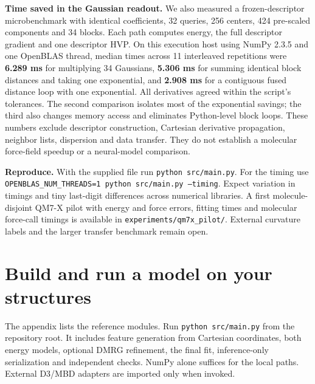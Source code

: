 \documentclass[11pt,a4paper]{article}
\begin{document}
\textbf{Time saved in the Gaussian readout.} We also measured a frozen-descriptor microbenchmark with identical coefficients, 32 queries, 256 centers, 424 pre-scaled components and 34 blocks. Each path computes energy, the full descriptor gradient and one descriptor HVP. On this execution host using NumPy 2.3.5 and one OpenBLAS thread, median times across 11 interleaved repetitions were \textbf{6.289 ms} for multiplying 34 Gaussians, \textbf{5.306 ms} for summing identical block distances and taking one exponential, and \textbf{2.908 ms} for a contiguous fused distance loop with one exponential. All derivatives agreed within the script's tolerances. The second comparison isolates most of the exponential savings; the third also changes memory access and eliminates Python-level block loops. These numbers exclude descriptor construction, Cartesian derivative propagation, neighbor lists, dispersion and data transfer. They do not establish a molecular force-field speedup or a neural-model comparison.

\textbf{Reproduce.} With the supplied file run \texttt{python src/main.py}. For the timing use \texttt{OPENBLAS\_NUM\_THREADS=1 python src/main.py --timing}. Expect variation in timings and tiny last-digit differences across numerical libraries. A first molecule-disjoint QM7-X pilot with energy and force errors, fitting times and molecular force-call timings is available in \texttt{experiments/qm7x\_pilot/}. External curvature labels and the larger transfer benchmark remain open.
\pg\section{Build and run a model on your structures}\label{sec:quick}
The appendix lists the reference modules. Run \texttt{python src/main.py} from the repository root. It includes feature generation from Cartesian coordinates, both energy models, optional DMRG refinement, the final fit, inference-only serialization and independent checks. NumPy alone suffices for the local paths. External D3/MBD adapters are imported only when invoked.
\end{document}

